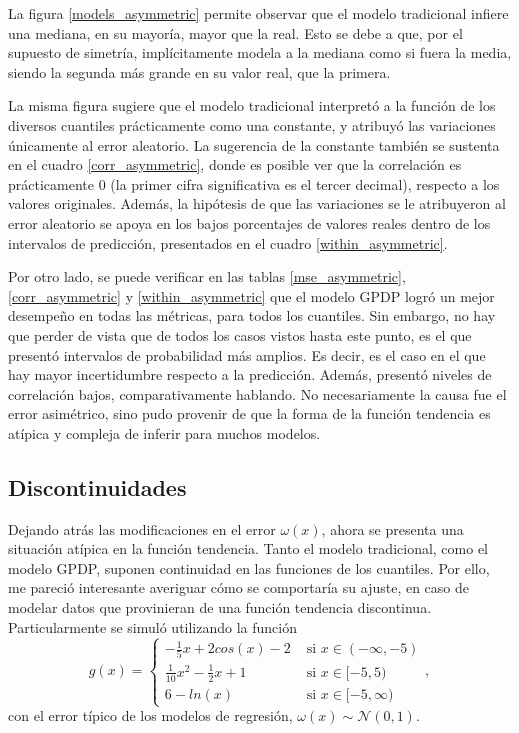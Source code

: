 La figura \ref{models_asymmetric} permite observar que el modelo tradicional infiere una mediana, en su mayor\'ia, mayor que la real. Esto se debe a que, por el supuesto de simetr\'ia, impl\'icitamente modela a la mediana como si fuera la media, siendo la segunda m\'as grande en su valor real, que la primera. 

La misma figura sugiere que el modelo tradicional interpret\'o a la funci\'on de los diversos cuantiles pr\'acticamente como una constante, y atribuy\'o las variaciones \'unicamente al error aleatorio. La sugerencia de la constante tambi\'en se sustenta en el cuadro \ref{corr_asymmetric}, donde es posible ver que la correlaci\'on es pr\'acticamente 0 (la primer cifra significativa es el tercer decimal), respecto a los valores originales. Adem\'as, la hip\'otesis de que las variaciones se le atribuyeron al error aleatorio se apoya en los bajos porcentajes de valores reales dentro de los intervalos de predicci\'on, presentados en el cuadro \ref{within_asymmetric}.

Por otro lado, se puede verificar en las tablas \ref{mse_asymmetric}, \ref{corr_asymmetric} y \ref{within_asymmetric} que el modelo GPDP logr\'o un mejor desempeño en todas las m\'etricas, para todos los cuantiles. Sin embargo, no hay que perder de vista que de todos los casos vistos hasta este punto, es el que present\'o intervalos de probabilidad m\'as amplios. Es decir, es el caso en el que hay mayor incertidumbre respecto a la predicci\'on. Adem\'as, present\'o niveles de correlaci\'on bajos, comparativamente hablando. No necesariamente la causa fue el error asim\'etrico, sino pudo provenir de que la forma de la funci\'on tendencia es at\'ipica y compleja de inferir para muchos modelos.

\subsection{Discontinuidades}

Dejando atr\'as las modificaciones en el error $\omega(x)$, ahora se presenta una situaci\'on at\'ipica en la funci\'on tendencia. Tanto el modelo tradicional, como el modelo GPDP, suponen continuidad en las funciones de los cuantiles. Por ello, me pareci\'o interesante averiguar c\'omo se comportar\'ia su ajuste, en caso de modelar datos que provinieran de una funci\'on tendencia discontinua. Particularmente se simul\'o utilizando la funci\'on
\begin{equation*}
g(x) = 
\begin{cases}
   - \frac{1}{5} x + 2cos(x) - 2 &\text{ si } x \in (-\infty, -5) \\
   \frac{1}{10} x^2 - \frac{1}{2}x + 1 &\text{ si } x \in [-5, 5) \\
   6 - ln(x) &\text{ si } x \in [-5, \infty)
\end{cases},
\end{equation*}
con el error t\'ipico de los modelos de regresi\'on, $\omega(x) \sim \mathcal{N}(0,1)$.

